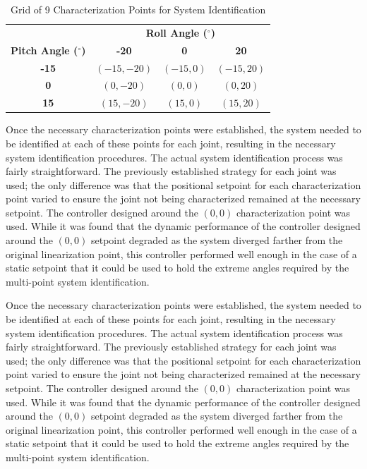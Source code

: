 \begin{table}[htbp]
    \centering
    \caption{Grid of 9 Characterization Points for System Identification}
    \label{tab:characterization_points}
    \begin{tabular}{c|ccc} %
        \multicolumn{1}{c}{} & \multicolumn{3}{c}{\textbf{Roll Angle ($^\circ$)}} \\
        \cmidrule(lr){2-4} %
        \textbf{Pitch Angle ($^\circ$)} & \textbf{-20} & \textbf{0} & \textbf{20} \\
        \midrule %
        \textbf{-15} & $(-15, -20)$ & $(-15, 0)$ & $(-15, 20)$ \\
        \textbf{0}   & $(0, -20)$   & $(0, 0)$   & $(0, 20)$   \\
        \textbf{15}  & $(15, -20)$  & $(15, 0)$  & $(15, 20)$  \\
        \bottomrule
    \end{tabular}
\end{table}

Once the necessary characterization points were established, the system needed to be identified at each of these points for each joint, resulting in the necessary system identification procedures. The actual system identification process was fairly straightforward. The previously established strategy for each joint was used; the only difference was that the positional setpoint for each characterization point varied to ensure the joint not being characterized remained at the necessary setpoint. The controller designed around the $(0,0)$ characterization point was used. While it was found that the dynamic performance of the controller designed around the $(0,0)$ setpoint degraded as the system diverged farther from the original linearization point, this controller performed well enough in the case of a static setpoint that it could be used to hold the extreme angles required by the multi-point system identification.

Once the necessary characterization points were established, the system needed to be identified at each of these points for each joint, resulting in the necessary system identification procedures. The actual system identification process was fairly straightforward. The previously established strategy for each joint was used; the only difference was that the positional setpoint for each characterization point varied to ensure the joint not being characterized remained at the necessary setpoint. The controller designed around the $(0,0)$ characterization point was used. While it was found that the dynamic performance of the controller designed around the $(0,0)$ setpoint degraded as the system diverged farther from the original linearization point, this controller performed well enough in the case of a static setpoint that it could be used to hold the extreme angles required by the multi-point system identification.

